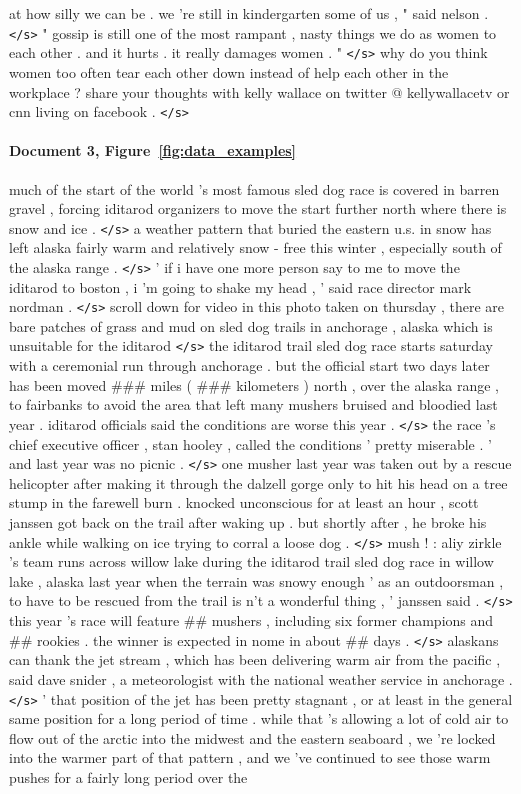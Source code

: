 \documentclass[12pt]{report}
\begin{document}
\begin{appendices}
at how silly we can be . we 're still in kindergarten some of us , " said nelson . \texttt{</s>} " gossip is still one of the most rampant , nasty things we do as women to each other . and it hurts . it really damages women . " \texttt{</s>} why do you think women too often tear each other down instead of help each other in the workplace ? share your thoughts with kelly wallace on twitter @ kellywallacetv or cnn living on facebook . \texttt{</s>}

\paragraph{Document 3, Figure~\ref{fig:data_examples}}  much of the start of the world 's most famous sled dog race is covered in barren gravel , forcing iditarod organizers to move the start further north where there is snow and ice . \texttt{</s>} a weather pattern that buried the eastern u.s. in snow has left alaska fairly warm and relatively snow - free this winter , especially south of the alaska range . \texttt{</s>} ' if i have one more person say to me to move the iditarod to boston , i 'm going to shake my head , ' said race director mark nordman . \texttt{</s>} scroll down for video in this photo taken on thursday , there are bare patches of grass and mud on sled dog trails in anchorage , alaska which is unsuitable for the iditarod \texttt{</s>} the iditarod trail sled dog race starts saturday with a ceremonial run through anchorage . but the official start two days later has been moved \#\#\# miles ( \#\#\# kilometers ) north , over the alaska range , to fairbanks to avoid the area that left many mushers bruised and bloodied last year . iditarod officials said the conditions are worse this year . \texttt{</s>} the race 's chief executive officer , stan hooley , called the conditions ' pretty miserable . ' and last year was no picnic . \texttt{</s>} one musher last year was taken out by a rescue helicopter after making it through the dalzell gorge only to hit his head on a tree stump in the farewell burn . knocked unconscious for at least an hour , scott janssen got back on the trail after waking up . but shortly after , he broke his ankle while walking on ice trying to corral a loose dog . \texttt{</s>} mush ! : aliy zirkle 's team runs across willow lake during the iditarod trail sled dog race in willow lake , alaska last year when the terrain was snowy enough ' as an outdoorsman , to have to be rescued from the trail is n't a wonderful thing , ' janssen said . \texttt{</s>} this year 's race will feature \#\# mushers , including six former champions and \#\# rookies . the winner is expected in nome in about \#\# days . \texttt{</s>} alaskans can thank the jet stream , which has been delivering warm air from the pacific , said dave snider , a meteorologist with the national weather service in anchorage . \texttt{</s>} ' that position of the jet has been pretty stagnant , or at least in the general same position for a long period of time . while that 's allowing a lot of cold air to flow out of the arctic into the midwest and the eastern seaboard , we 're locked into the warmer part of that pattern , and we 've continued to see those warm pushes for a fairly long period over the 
\end{appendices}
\end{document}
